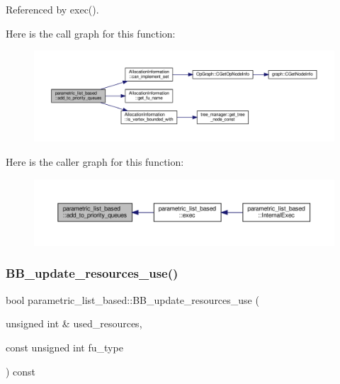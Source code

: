 Referenced by exec().

Here is the call graph for this function\+:
\nopagebreak
\begin{figure}[H]
\begin{center}
\leavevmode
\includegraphics[width=350pt]{d7/d47/classparametric__list__based_af39742ae903d232505b44c793bf6c236_cgraph}
\end{center}
\end{figure}
Here is the caller graph for this function\+:
\nopagebreak
\begin{figure}[H]
\begin{center}
\leavevmode
\includegraphics[width=350pt]{d7/d47/classparametric__list__based_af39742ae903d232505b44c793bf6c236_icgraph}
\end{center}
\end{figure}
\mbox{\label{classparametric__list__based_a3295dddee18a9c4091ad9bec2b23cc9f}} 
\subsubsection{\texorpdfstring{B\+B\+\_\+update\+\_\+resources\+\_\+use()}{BB\_update\_resources\_use()}}
{\footnotesize\ttfamily bool parametric\+\_\+list\+\_\+based\+::\+B\+B\+\_\+update\+\_\+resources\+\_\+use (\begin{DoxyParamCaption}\item[{unsigned int \&}]{used\+\_\+resources,  }\item[{const unsigned int}]{fu\+\_\+type }\end{DoxyParamCaption}) const\hspace{0.3cm}{\ttfamily [private]}}



